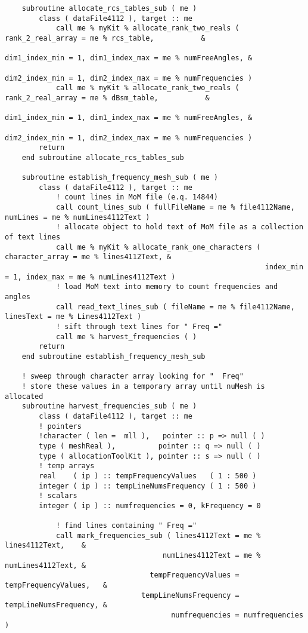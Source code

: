 {{\begin{lstlisting}
    subroutine allocate_rcs_tables_sub ( me )
        class ( dataFile4112 ), target :: me
            call me % myKit % allocate_rank_two_reals (  rank_2_real_array = me % rcs_table,           &
                                                            dim1_index_min = 1, dim1_index_max = me % numFreeAngles, &
                                                            dim2_index_min = 1, dim2_index_max = me % numFrequencies )
            call me % myKit % allocate_rank_two_reals (  rank_2_real_array = me % dBsm_table,           &
                                                            dim1_index_min = 1, dim1_index_max = me % numFreeAngles, &
                                                            dim2_index_min = 1, dim2_index_max = me % numFrequencies )
        return
    end subroutine allocate_rcs_tables_sub

    subroutine establish_frequency_mesh_sub ( me )
        class ( dataFile4112 ), target :: me
            ! count lines in MoM file (e.q. 14844)
            call count_lines_sub ( fullFileName = me % file4112Name, numLines = me % numLines4112Text )
            ! allocate object to hold text of MoM file as a collection of text lines
            call me % myKit % allocate_rank_one_characters ( character_array = me % lines4112Text, &
                                                             index_min = 1, index_max = me % numLines4112Text )
            ! load MoM text into memory to count frequencies and angles
            call read_text_lines_sub ( fileName = me % file4112Name, linesText = me % Lines4112Text )
            ! sift through text lines for " Freq ="
            call me % harvest_frequencies ( )
        return
    end subroutine establish_frequency_mesh_sub

    ! sweep through character array looking for "  Freq"
    ! store these values in a temporary array until nuMesh is allocated
    subroutine harvest_frequencies_sub ( me )
        class ( dataFile4112 ), target :: me
        ! pointers
        !character ( len =  mll ),   pointer :: p => null ( )
        type ( meshReal ),          pointer :: q => null ( )
        type ( allocationToolKit ), pointer :: s => null ( )
        ! temp arrays
        real    ( ip ) :: tempFrequencyValues   ( 1 : 500 )
        integer ( ip ) :: tempLineNumsFrequency ( 1 : 500 )
        ! scalars
        integer ( ip ) :: numfrequencies = 0, kFrequency = 0

            ! find lines containing " Freq ="
            call mark_frequencies_sub ( lines4112Text = me % lines4112Text,    &
                                     numLines4112Text = me % numLines4112Text, &
                                  tempFrequencyValues = tempFrequencyValues,   &
                                tempLineNumsFrequency = tempLineNumsFrequency, &
                                       numfrequencies = numfrequencies )


\end{lstlisting}}}

